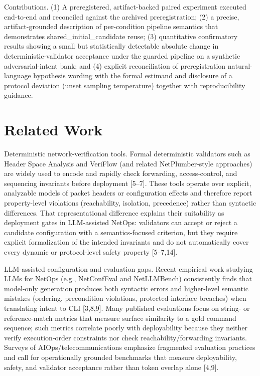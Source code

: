 \documentclass[conference]{IEEEtran}
\begin{document}
Contributions. (1) A preregistered, artifact-backed paired experiment executed end-to-end and reconciled against the archived preregistration; (2) a precise, artifact-grounded description of per-condition pipeline semantics that demonstrates shared\_initial\_candidate reuse; (3) quantitative confirmatory results showing a small but statistically detectable absolute change in deterministic-validator acceptance under the guarded pipeline on a synthetic adversarial-intent bank; and (4) explicit reconciliation of preregistration natural-language hypothesis wording with the formal estimand and disclosure of a protocol deviation (unset sampling temperature) together with reproducibility guidance.

\section{Related Work}
Deterministic network-verification tools. Formal deterministic validators such as Header Space Analysis and VeriFlow (and related NetPlumber-style approaches) are widely used to encode and rapidly check forwarding, access-control, and sequencing invariants before deployment [5--7]. These tools operate over explicit, analyzable models of packet headers or configuration effects and therefore report property-level violations (reachability, isolation, precedence) rather than syntactic differences. That representational difference explains their suitability as deployment gates in LLM-assisted NetOps: validators can accept or reject a candidate configuration with a semantics-focused criterion, but they require explicit formalization of the intended invariants and do not automatically cover every dynamic or protocol-level safety property [5--7,14].

LLM-assisted configuration and evaluation gaps. Recent empirical work studying LLMs for NetOps (e.g., NetConfEval and NetLLMBench) consistently finds that model-only generation produces both syntactic errors and higher-level semantic mistakes (ordering, precondition violations, protected-interface breaches) when translating intent to CLI [3,8,9]. Many published evaluations focus on string- or reference-match metrics that measure surface similarity to a gold command sequence; such metrics correlate poorly with deployability because they neither verify execution-order constraints nor check reachability/forwarding invariants. Surveys of AIOps/telecommunications emphasize fragmented evaluation practices and call for operationally grounded benchmarks that measure deployability, safety, and validator acceptance rather than token overlap alone [4,9].
\end{document}
